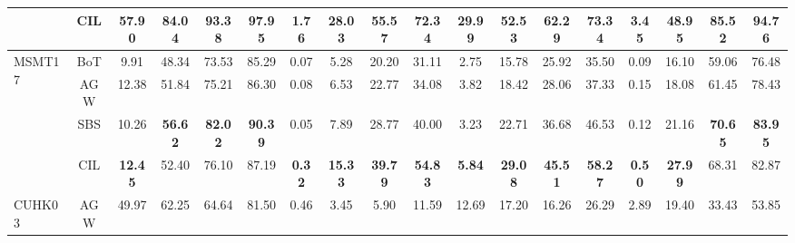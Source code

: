 \begin{table}[t]
\begin{tabular}{lc|cccc|cccc|cccc|cccc}
                                     & CIL                     & 57.90                            & 84.04                                & 93.38                                & 97.95                                 & \textbf{1.76} & \textbf{28.03} & \textbf{55.57} & \textbf{72.34} & \textbf{29.99} & \textbf{52.53} & \textbf{62.29} & \textbf{73.34} & \textbf{3.45} & \textbf{48.95} & \textbf{85.52} & \textbf{94.76} \\
        \hline
\multirow{4}{*}{MSMT17}      & BoT                     & 9.91                             & 48.34                                & 73.53                                & 85.29                                 & 0.07          & 5.28           & 20.20          & 31.11          & 2.75           & 15.78          & 25.92          & 35.50          & 0.09          & 16.10          & 59.06          & 76.48          \\
                                     & AGW                     & 12.38                            & 51.84                                & 75.21                                & 86.30                                 & 0.08          & 6.53           & 22.77          & 34.08          & 3.82           & 18.42          & 28.06          & 37.33          & 0.15          & 18.08          & 61.45          & 78.43          \\
                                     & SBS                     & 10.26                            & \textbf{56.62}                       & \textbf{82.02}                       & \textbf{90.39}                        & 0.05          & 7.89           & 28.77          & 40.00          & 3.23           & 22.71          & 36.68          & 46.53          & 0.12          & 21.16          & \textbf{70.65} & \textbf{83.95} \\
                                     & CIL                     & \textbf{12.45}                   & 52.40                                & 76.10                                & 87.19                                 & \textbf{0.32} & \textbf{15.33} & \textbf{39.79} & \textbf{54.83} & \textbf{5.84}  & \textbf{29.08} & \textbf{45.51} & \textbf{58.27} & \textbf{0.50} & \textbf{27.99} & 68.31          & 82.87          \\
        \hline
        \multirow{2}{*}{CUHK03}      & AGW                     & 49.97                            & 62.25                                & 64.64                                & 81.50                                 & 0.46          & 3.45           & 5.90           & 11.59          & 12.69          & 17.20          & 16.26          & 26.29          & 2.89          & 19.40          & 33.43          & 53.85          \\

\end{tabular}
\end{table}
